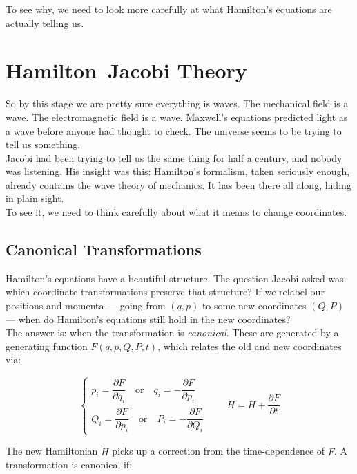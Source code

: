 \documentclass[krantz1,ChapterTOCs]{krantz}
\begin{document}
To see why, we need to look more carefully at what Hamilton's equations are actually telling us.\\

\section*{Hamilton--Jacobi Theory}

So by this stage we are pretty sure everything is waves. The 
mechanical field is a wave. The electromagnetic field is a wave. 
Maxwell's equations predicted light as a wave before anyone had 
thought to check. The universe seems to be trying to tell us 
something.\\

Jacobi had been trying to tell us the same thing for half a century, 
and nobody was listening. His insight was this: Hamilton's formalism, 
taken seriously enough, already contains the wave theory of mechanics. 
It has been there all along, hiding in plain sight.\\

To see it, we need to think carefully about what it means to change 
coordinates.\\

\subsection*{Canonical Transformations}

Hamilton's equations have a beautiful structure. The question Jacobi 
asked was: which coordinate transformations preserve that structure? 
If we relabel our positions and momenta --- going from $(q, p)$ to 
some new coordinates $(Q, P)$ --- when do Hamilton's equations still 
hold in the new coordinates?\\

The answer is: when the transformation is \textit{canonical}. These 
are generated by a generating function $F(q, p, Q, P, t)$, which 
relates the old and new coordinates via:

\[
\begin{cases}
p_i = \dfrac{\partial F}{\partial q_i} \quad\text{or}\quad 
q_i = -\dfrac{\partial F}{\partial p_i} \\[8pt]
Q_i = \dfrac{\partial F}{\partial p_i} \quad\text{or}\quad 
P_i = -\dfrac{\partial F}{\partial Q_i}
\end{cases}
\qquad \tilde{H} = H + \frac{\partial F}{\partial t}
\]

The new Hamiltonian $\tilde{H}$ picks up a correction from the 
time-dependence of $F$. A transformation is canonical if:
\end{document}
